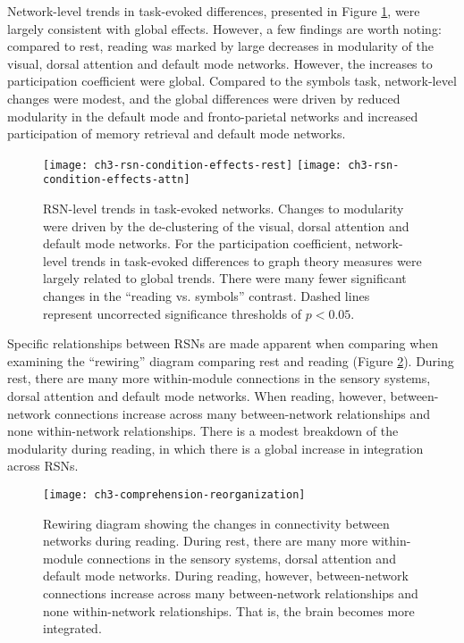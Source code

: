 Network-level trends in task-evoked differences, presented in Figure \ref{fig:ch3-rsn-condition-effects}, were largely consistent with global effects. However, a few findings are worth noting: compared to rest, reading was marked by large decreases in modularity of the visual, dorsal attention and default mode networks. However, the increases to participation coefficient were global. Compared to the symbols task, network-level changes were modest, and the global differences were driven by reduced modularity in the default mode and fronto-parietal networks and increased participation of memory retrieval and default mode networks.

\begin{figure}[t!]
	\centering
	\texttt{[image: ch3-rsn-condition-effects-rest]}
	\texttt{[image: ch3-rsn-condition-effects-attn]}
    \caption[RSN-level trends in task-evoked networks]{RSN-level trends in task-evoked networks. Changes to modularity were driven by the de-clustering of the visual, dorsal attention and default mode networks. For the participation coefficient, network-level trends in task-evoked differences to graph theory measures were largely related to global trends. There were many fewer significant changes in the ``reading vs. symbols'' contrast. Dashed lines represent uncorrected significance thresholds of $p < 0.05$.}
	\label{fig:ch3-rsn-condition-effects}
\end{figure}

Specific relationships between RSNs are made apparent when comparing when examining the ``rewiring'' diagram comparing rest and reading (Figure \ref{fig:ch3-comprehension-reorganization}). During rest, there are many more within-module connections in the sensory systems, dorsal attention and default mode networks. When reading, however, between-network connections increase across many between-network relationships and none within-network relationships. There is a modest breakdown of the modularity during reading, in which there is a global increase in integration across RSNs.

\begin{figure}[t!]
	\centering
	\texttt{[image: ch3-comprehension-reorganization]}
    \caption[Rewiring of RSNs during reading]{Rewiring diagram showing the changes in connectivity between networks during reading. During rest, there are many more within-module connections in the sensory systems, dorsal attention and default mode networks. During reading, however, between-network connections increase across many between-network relationships and none within-network relationships. That is, the brain becomes more integrated.}
	\label{fig:ch3-comprehension-reorganization}
\end{figure}

